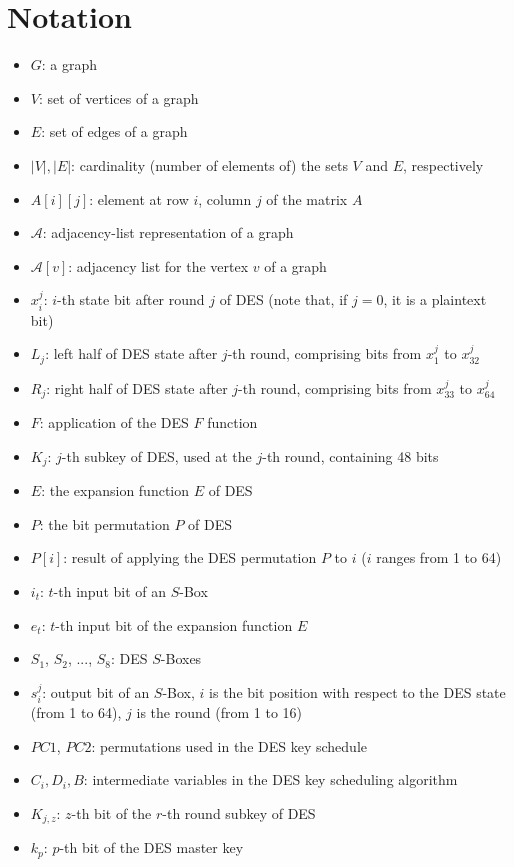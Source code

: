 \documentclass{report}
\begin{document}
\section{Notation}
\begin{itemize}
    \item $G$: a graph
    \item $V$: set of vertices of a graph
    \item $E$: set of edges of a graph
    \item $|V|, |E|$: cardinality (number of elements of) the sets $V$ and $E$, respectively
    \item $A[i][j]$: element at row $i$, column $j$ of the matrix $A$
    \item $\mathcal{A}$: adjacency-list representation of a graph
    \item $\mathcal{A}[v]$: adjacency list for the vertex $v$ of a graph
    \item $x^j_i$: $i$-th state bit after round $j$ of DES (note that, if $j = 0$, it is a plaintext bit)
    \item $L_j$: left half of DES state after $j$-th round, comprising bits from $x^j_1$ to $x^j_{32}$
    \item $R_j$: right half of DES state after $j$-th round, comprising bits from $x^j_{33}$ to $x^j_{64}$
    \item $F$: application of the DES $F$ function
    \item $K_j$: $j$-th subkey of DES, used at the $j$-th round, containing 48 bits
    \item $E$: the expansion function $E$ of DES
    \item $P$: the bit permutation $P$ of DES
    \item $P[i]$: result of applying the DES permutation $P$ to $i$ ($i$ ranges from 1 to 64)
    \item $i_t$: $t$-th input bit of an $S$-Box
    \item $e_t$: $t$-th input bit of the expansion function $E$
    \item $S_1$, $S_2$, ..., $S_8$: DES $S$-Boxes
    \item $s^j_i$: output bit of an $S$-Box, $i$ is the bit position with respect to the DES state (from 1 to 64), $j$ is the round (from 1 to 16)
    \item $PC1$, $PC2$: permutations used in the DES key schedule
    \item $C_i, D_i, B$: intermediate variables in the DES key scheduling algorithm
    \item $K_{j,z}$: $z$-th bit of the $r$-th round subkey of DES
    \item $k_p$: $p$-th bit of the DES master key
\end{itemize}
\end{document}
